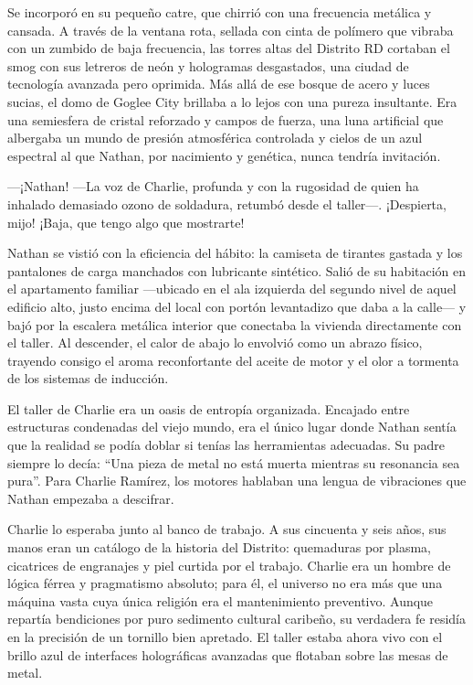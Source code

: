 \documentclass[12pt,a4paper]{book}
\begin{document}
Se incorporó en su pequeño catre, que chirrió con una frecuencia metálica y cansada. A través de la ventana rota, sellada con cinta de polímero que vibraba con un zumbido de baja frecuencia, las torres altas del Distrito RD cortaban el smog con sus letreros de neón y hologramas desgastados, una ciudad de tecnología avanzada pero oprimida. Más allá de ese bosque de acero y luces sucias, el domo de Goglee City brillaba a lo lejos con una pureza insultante. Era una semiesfera de cristal reforzado y campos de fuerza, una luna artificial que albergaba un mundo de presión atmosférica controlada y cielos de un azul espectral al que Nathan, por nacimiento y genética, nunca tendría invitación.

---¡Nathan! ---La voz de Charlie, profunda y con la rugosidad de quien ha inhalado demasiado ozono de soldadura, retumbó desde el taller---. ¡Despierta, mijo! ¡Baja, que tengo algo que mostrarte!

Nathan se vistió con la eficiencia del hábito: la camiseta de tirantes gastada y los pantalones de carga manchados con lubricante sintético. Salió de su habitación en el apartamento familiar ---ubicado en el ala izquierda del segundo nivel de aquel edificio alto, justo encima del local con portón levantadizo que daba a la calle--- y bajó por la escalera metálica interior que conectaba la vivienda directamente con el taller. Al descender, el calor de abajo lo envolvió como un abrazo físico, trayendo consigo el aroma reconfortante del aceite de motor y el olor a tormenta de los sistemas de inducción.

El taller de Charlie era un oasis de entropía organizada. Encajado entre estructuras condenadas del viejo mundo, era el único lugar donde Nathan sentía que la realidad se podía doblar si tenías las herramientas adecuadas. Su padre siempre lo decía: ``Una pieza de metal no está muerta mientras su resonancia sea pura''. Para Charlie Ramírez, los motores hablaban una lengua de vibraciones que Nathan empezaba a descifrar.

Charlie lo esperaba junto al banco de trabajo. A sus cincuenta y seis años, sus manos eran un catálogo de la historia del Distrito: quemaduras por plasma, cicatrices de engranajes y piel curtida por el trabajo. Charlie era un hombre de lógica férrea y pragmatismo absoluto; para él, el universo no era más que una máquina vasta cuya única religión era el mantenimiento preventivo. Aunque repartía bendiciones por puro sedimento cultural caribeño, su verdadera fe residía en la precisión de un tornillo bien apretado. El taller estaba ahora vivo con el brillo azul de interfaces holográficas avanzadas que flotaban sobre las mesas de metal.
\end{document}
